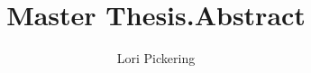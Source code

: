 \documentclass[../../main/main.tex]{subfiles}
\begin{document}
\title{Master Thesis.Abstract}
\author{Lori Pickering}
\begin{abstract}

\end{abstract}
\end{document}
